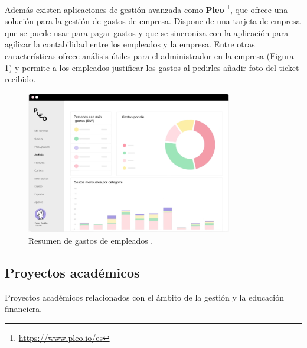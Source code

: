 Además existen aplicaciones de gestión avanzada como \textbf{Pleo} 
\footnote{\url{https://www.pleo.io/es}}, que ofrece una solución para la gestión 
de gastos de empresa. Dispone de una tarjeta 
de empresa que se puede usar para pagar gastos y que se sincroniza con la aplicación 
para agilizar la contabilidad entre los empleados y la empresa. 
Entre otras características ofrece análisis útiles para el administrador en la empresa (Figura \ref{fig:resumen_gastos_pleo})
y permite a los empleados justificar los gastos al pedirles añadir foto del ticket recibido.
\begin{figure}[ht!]
    \centering
    \includegraphics[width = 90mm]{imagenes/resumen-gastos-pleo.png}
    \caption{Resumen de gastos de empleados \cite{gastos-pleo}.}
    \label{fig:resumen_gastos_pleo}
\end{figure}


\subsection{Proyectos académicos}
Proyectos académicos relacionados con el ámbito de la gestión y la educación financiera.

